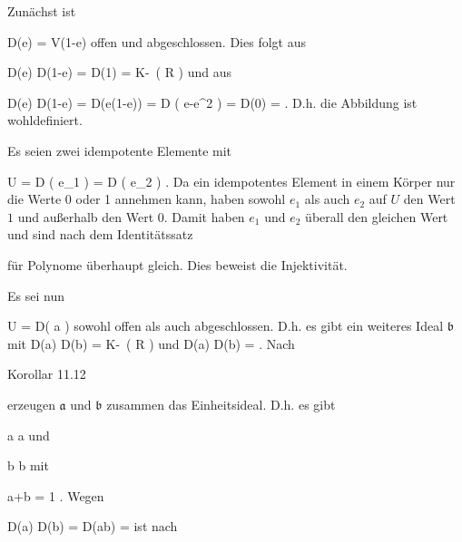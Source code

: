 {





\teilbeweis {}{}{}
{Zunächst ist

\mavergleichskette
{\vergleichskette
{ D(e)
}
{ = }{ V(1-e)
}
{  }{
}
{    }{
}
{   }{
}
}
{}{}{}
offen und abgeschlossen. Dies folgt aus

\mavergleichskettedisp
{\vergleichskette
{ D(e) \cup D(1-e)
}
{ =} { D(1)
}
{ =} { K\!-\!\, \left(   R   \right)
}
{ } {
}
{ } {
}
}
{}{}{}
und aus

\mavergleichskettedisp
{\vergleichskette
{ D(e) \cap D(1-e)
}
{ =} { D(e(1-e))
}
{ =} { D \left(  e-e^2  \right)
}
{ =} { D(0)
}
{ =} { \emptyset
}
}
{}{}{.}
D.h. die Abbildung ist wohldefiniert.}
{}
\teilbeweis {}{}{}
{Es seien
 zwei idempotente Elemente mit

\mavergleichskette
{\vergleichskette
{ U
}
{ = }{ D \left(  e_1  \right)
}
{ = }{ D \left(  e_2  \right)
}
{    }{
}
{   }{
}
}
{}{}{.}
Da ein idempotentes Element in einem Körper nur die Werte
\mathkor {} {0} {oder} {1} {}
annehmen kann, haben sowohl $e_1$ als auch $e_2$ auf $U$ den Wert $1$ und außerhalb den Wert $0$. Damit haben $e_1$ und $e_2$ überall den gleichen Wert und sind
nach dem
Identitätssatz

für Polynome überhaupt gleich. Dies beweist die Injektivität.}
{}
\teilbeweis {}{}{}
{Es sei nun

\mavergleichskette
{\vergleichskette
{ U
}
{ = }{ D( {\mathfrak a} )
}
{  }{
}
{    }{
}
{   }{
}
}
{}{}{}
sowohl offen als auch abgeschlossen. D.h. es gibt ein weiteres Ideal ${\mathfrak b}$ mit
\mathkor {} {D({\mathfrak a}) \cup D({\mathfrak b}) = K\!-\!\, \left(   R   \right)} {und} {D({\mathfrak a}) \cap D({\mathfrak b}) = \emptyset} {.}
Nach

Korollar 11.12

erzeugen ${\mathfrak a}$ und ${\mathfrak b}$ zusammen das Einheitsideal. D.h. es gibt

\mavergleichskette
{\vergleichskette
{ a
}
{ \in }{ {\mathfrak a}
}
{  }{
}
{    }{
}
{   }{
}
}
{}{}{}
und

\mavergleichskette
{\vergleichskette
{ b
}
{ \in }{ {\mathfrak b}
}
{  }{
}
{    }{
}
{   }{
}
}
{}{}{}
mit

\mavergleichskette
{\vergleichskette
{ a+b
}
{ = }{ 1
}
{  }{
}
{    }{
}
{   }{
}
}
{}{}{.}
Wegen

\mavergleichskette
{\vergleichskette
{ D(a) \cap D(b)
}
{ = }{ D(ab)
}
{ = }{ \emptyset
}
{    }{
}
{   }{
}
}
{}{}{}
ist nach

}}
